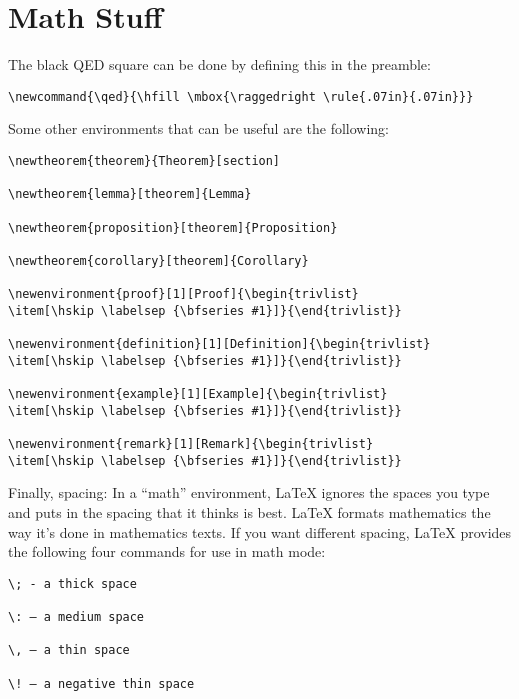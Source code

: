 \documentclass[a4paper,10pt,twocolumn]{article}
\begin{document}
\section{Math Stuff}
The black QED square can be done by defining this in the preamble:
\begin{verbatim}
\newcommand{\qed}{\hfill \mbox{\raggedright \rule{.07in}{.07in}}}
\end{verbatim}
Some other environments that can be useful are the following:
\begin{verbatim}
\newtheorem{theorem}{Theorem}[section]

\newtheorem{lemma}[theorem]{Lemma}

\newtheorem{proposition}[theorem]{Proposition}

\newtheorem{corollary}[theorem]{Corollary}

\newenvironment{proof}[1][Proof]{\begin{trivlist}
\item[\hskip \labelsep {\bfseries #1}]}{\end{trivlist}}

\newenvironment{definition}[1][Definition]{\begin{trivlist}
\item[\hskip \labelsep {\bfseries #1}]}{\end{trivlist}}

\newenvironment{example}[1][Example]{\begin{trivlist}
\item[\hskip \labelsep {\bfseries #1}]}{\end{trivlist}}

\newenvironment{remark}[1][Remark]{\begin{trivlist}
\item[\hskip \labelsep {\bfseries #1}]}{\end{trivlist}}
\end{verbatim}

Finally, spacing: In a ``math'' environment, LaTeX ignores the spaces you type 
and puts in the spacing that it thinks is best. LaTeX formats mathematics the
way it’s done in mathematics texts. If you want different spacing, LaTeX 
provides the following four commands for use in math mode:

\begin{verbatim}
\; - a thick space

\: – a medium space

\, – a thin space

\! – a negative thin space 
\end{verbatim}

\end{document}
